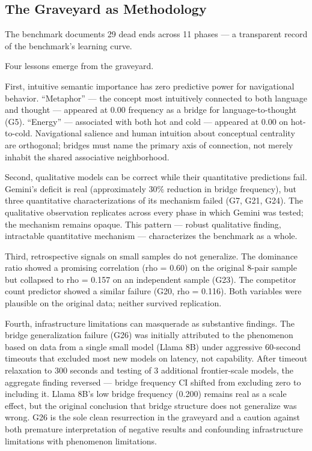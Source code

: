 \subsection{The Graveyard as Methodology}\label{the-graveyard-as-methodology}

The benchmark documents 29 dead ends across 11 phases --- a transparent record of the benchmark's learning curve.

Four lessons emerge from the graveyard.

First, intuitive semantic importance has zero predictive power for navigational behavior. ``Metaphor'' --- the concept most intuitively connected to both language and thought --- appeared at 0.00 frequency as a bridge for language-to-thought (G5). ``Energy'' --- associated with both hot and cold --- appeared at 0.00 on hot-to-cold. Navigational salience and human intuition about conceptual centrality are orthogonal; bridges must name the primary axis of connection, not merely inhabit the shared associative neighborhood.

Second, qualitative models can be correct while their quantitative predictions fail. Gemini's deficit is real (approximately 30\% reduction in bridge frequency), but three quantitative characterizations of its mechanism failed (G7, G21, G24). The qualitative observation replicates across every phase in which Gemini was tested; the mechanism remains opaque. This pattern --- robust qualitative finding, intractable quantitative mechanism --- characterizes the benchmark as a whole.

Third, retrospective signals on small samples do not generalize. The dominance ratio showed a promising correlation (rho = 0.60) on the original 8-pair sample but collapsed to rho = 0.157 on an independent sample (G23). The competitor count predictor showed a similar failure (G20, rho = 0.116). Both variables were plausible on the original data; neither survived replication.

Fourth, infrastructure limitations can masquerade as substantive findings. The bridge generalization failure (G26) was initially attributed to the phenomenon based on data from a single small model (Llama 8B) under aggressive 60-second timeouts that excluded most new models on latency, not capability. After timeout relaxation to 300 seconds and testing of 3 additional frontier-scale models, the aggregate finding reversed --- bridge frequency CI shifted from excluding zero to including it. Llama 8B's low bridge frequency (0.200) remains real as a scale effect, but the original conclusion that bridge structure does not generalize was wrong. G26 is the sole clean resurrection in the graveyard and a caution against both premature interpretation of negative results and confounding infrastructure limitations with phenomenon limitations.

